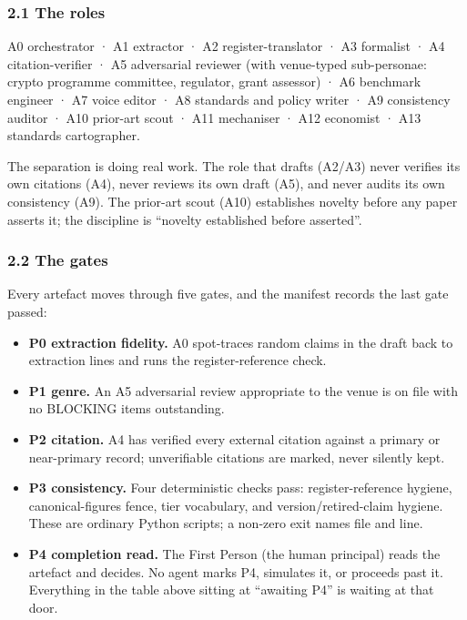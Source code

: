 \documentclass[
  11pt,
]{article}
\providecommand{\tightlist}{%
  \setlength{\itemsep}{0pt}\setlength{\parskip}{0pt}}
\begin{document}
\subsubsection{2.1 The roles}\label{the-roles}

A0 orchestrator · A1 extractor · A2 register-translator · A3 formalist ·
A4 citation-verifier · A5 adversarial reviewer (with venue-typed
sub-personae: crypto programme committee, regulator, grant assessor) ·
A6 benchmark engineer · A7 voice editor · A8 standards and policy writer
· A9 consistency auditor · A10 prior-art scout · A11 mechaniser · A12
economist · A13 standards cartographer.

The separation is doing real work. The role that drafts (A2/A3) never
verifies its own citations (A4), never reviews its own draft (A5), and
never audits its own consistency (A9). The prior-art scout (A10)
establishes novelty before any paper asserts it; the discipline is
``novelty established before asserted''.

\subsubsection{2.2 The gates}\label{the-gates}

Every artefact moves through five gates, and the manifest records the
last gate passed:

\begin{itemize}
\tightlist
\item
  \textbf{P0 extraction fidelity.} A0 spot-traces random claims in the
  draft back to extraction lines and runs the register-reference check.
\item
  \textbf{P1 genre.} An A5 adversarial review appropriate to the venue
  is on file with no BLOCKING items outstanding.
\item
  \textbf{P2 citation.} A4 has verified every external citation against
  a primary or near-primary record; unverifiable citations are marked,
  never silently kept.
\item
  \textbf{P3 consistency.} Four deterministic checks pass:
  register-reference hygiene, canonical-figures fence, tier vocabulary,
  and version/retired-claim hygiene. These are ordinary Python scripts;
  a non-zero exit names file and line.
\item
  \textbf{P4 completion read.} The First Person (the human principal)
  reads the artefact and decides. No agent marks P4, simulates it, or
  proceeds past it. Everything in the table above sitting at ``awaiting
  P4'' is waiting at that door.
\end{itemize}
\end{document}
